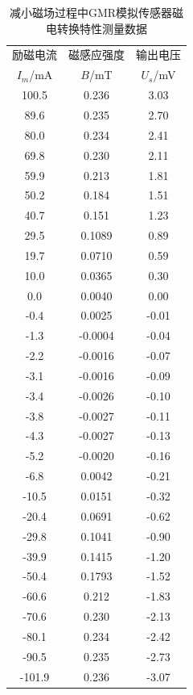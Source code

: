 \documentclass{thuemp}
\begin{document}
\begin{table}[H]
    \centering
    \captionnamefont{\wuhao\bf\heiti}
    \captiontitlefont{\wuhao\bf\heiti}
    \caption{减小磁场过程中GMR模拟传感器磁电转换特性测量数据} \label{tab:gmrsensor_desc}
    \liuhao
    \begin{tabular}{ccc}
        \toprule
        励磁电流 & 磁感应强度 & 输出电压  \\
        $I_m$/\si{\milli\ampere} & $B$/\si{\milli\tesla} & $U_s$/\si{\milli\volt} \\
        \midrule
        100.5  & 0.236    &  3.03 \\
        89.6   & 0.235    &  2.70 \\
        80.0   & 0.234    &  2.41 \\
        69.8   & 0.230    &  2.11 \\
        59.9   & 0.213    &  1.81 \\
        50.2   & 0.184    &  1.51 \\
        40.7   & 0.151    &  1.23 \\
        29.5   & 0.1089   &  0.89 \\
        19.7   & 0.0710   &  0.59 \\
        10.0   & 0.0365   &  0.30 \\
        0.0    & 0.0040   &  0.00 \\
        -0.4   & 0.0025   & -0.01 \\
        -1.3   & -0.0004  & -0.04 \\
        -2.2   & -0.0016  & -0.07 \\
        -3.1   & -0.0016  & -0.09 \\
        -3.4   & -0.0026  & -0.10 \\
        -3.8   & -0.0027  & -0.11 \\
        -4.3   & -0.0027  & -0.13 \\
        -5.2   & -0.0020  & -0.16 \\
        -6.8   & 0.0042   & -0.21 \\
        -10.5  & 0.0151   & -0.32 \\
        -20.4  & 0.0691   & -0.62 \\
        -29.8  & 0.1041   & -0.90 \\
        -39.9  & 0.1415   & -1.20 \\
        -50.4  & 0.1793   & -1.52 \\
        -60.6  & 0.212    & -1.83 \\
        -70.6  & 0.230    & -2.13 \\
        -80.1  & 0.234    & -2.42 \\
        -90.5  & 0.235    & -2.73 \\
        -101.9 & 0.236    & -3.07 \\
        \bottomrule
    \end{tabular}
\end{table}
\end{document}
